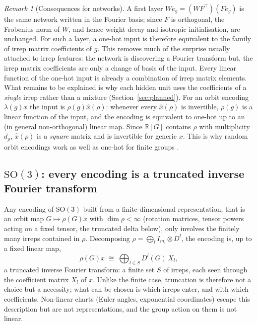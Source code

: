 \documentclass[a4paper,11pt]{article}
\theoremstyle{remark}
\newtheorem{remark}[proposition]{Remark}
\theoremstyle{definition}
\newcommand{\R}{\mathbb{R}}
\newcommand{\SO}{\mathrm{SO}(3)}
\begin{document}
\begin{remark}[Consequences for networks]\label{rem:onehot}
A first layer $W e_g=(WF^\top)(Fe_g)$ is the same network written in the
Fourier basis; since $F$ is orthogonal, the Frobenius norm of $W$, and hence
weight decay and isotropic initialisation, are unchanged. For such a layer, a
one-hot input is therefore equivalent to the family of irrep matrix coefficients of
$g$. This removes much of the surprise usually attached to irrep features: the
network is discovering a Fourier transform but, the irrep
matrix coefficients are only a change of basis of the input. Every linear function of the one-hot input is already a
combination of irrep matrix elements. What remains to be explained is why each
hidden unit uses the coefficients of a \emph{single} irrep rather than a mixture
(Section~\ref{sec:planned}). For an orbit encoding $\lambda(g)x$
the input is $\rho(g)\hat x(\rho)$: whenever every $\hat x(\rho)$ is
invertible, $\rho(g)$ is a linear function of the input, and the encoding is
equivalent to one-hot up to an (in general non-orthogonal) linear map. Since
$\R[G]$ contains $\rho$ with multiplicity $d_\rho$, $\hat x(\rho)$ is a
\emph{square} matrix and is invertible for generic $x$. This is why random
orbit encodings work as well as one-hot for finite groups
\cite{marchetti2026sequential}.
\end{remark}

\subsection{$\SO$: every encoding is a truncated inverse Fourier transform}

Any encoding of $\SO$ built from a finite-dimensional representation, that is an
orbit map $G\mapsto\rho(G)x$ with $\dim\rho<\infty$ (rotation matrices, tensor
powers acting on a fixed tensor, the truncated delta below), only involves the
finitely many irreps contained in $\rho$. Decomposing $\rho=\bigoplus_l
I_{m_l}\otimes D^l$, the encoding is, up to a fixed linear map,
\[
\rho(G)x\;\cong\;\bigoplus_{l\in S}D^l(G)\,X_l ,
\]
a truncated inverse Fourier transform: a finite set $S$ of irreps, each seen
through the coefficient matrix $X_l$ of $x$. Unlike the finite case, truncation is
therefore not a choice but a necessity; what can be chosen is which irreps enter,
and with which coefficients. Non-linear charts (Euler angles, exponential
coordinates) escape this description but are not representations, and the group
action on them is not linear.
\end{document}
